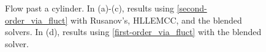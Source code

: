 \documentclass[preprint, 11pt]{article}
\begin{document}
\begin{figure}[!h]
{    
  }
  \caption{
    Flow past a cylinder. In (a)-(c), results using \eqref{second-order_via_fluct} 
    with Rusanov's, HLLEMCC, and the blended solvers.
    In (d), results using \eqref{first-order_via_fluct} with the blended solver.
    \label{fig:cylinder_flow}}
\end{figure}
\end{document}
